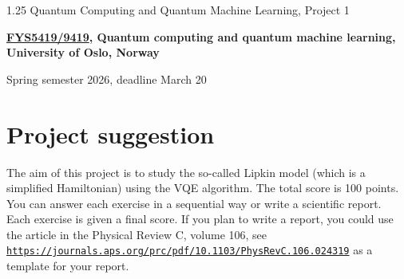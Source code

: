 \documentclass[%
oneside,                 %
final,                   %
10pt]{article}
\begin{document}

\newcommand{\exercisesection}[1]{\subsection*{#1}}






\thispagestyle{empty}

\begin{center}
{\LARGE\bf
\begin{spacing}{1.25}
Quantum Computing and Quantum Machine Learning, Project 1
\end{spacing}
}
\end{center}


\begin{center}
{\bf \href{{https://www.uio.no/studier/emner/matnat/fys/FYS5419/index-eng.html}}{FYS5419/9419}, Quantum computing and quantum machine learning, University of Oslo, Norway${}^{}$} \\ [0mm]
\end{center}

\begin{center}
\end{center}
    

\begin{center}
Spring semester 2026, deadline March 20
\end{center}

\vspace{1cm}


\section*{Project suggestion}

The aim of this project is to study the so-called Lipkin model (which is a simplified Hamiltonian) using the VQE algorithm.
The total score is 100 points. You can answer each exercise in a sequential way or write a scientific report. Each exercise is given a final score.
If you plan to write a report, you could use the article in the Physical Review C, volume 106, see \href{{https://journals.aps.org/prc/pdf/10.1103/PhysRevC.106.024319}}{\nolinkurl{https://journals.aps.org/prc/pdf/10.1103/PhysRevC.106.024319}} as a template for your report.
\end{document}
